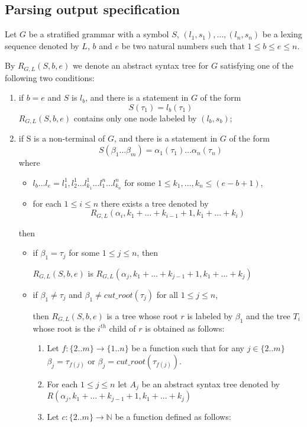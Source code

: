 \documentclass[a4paper,10pt]{article}
\begin{document}
\subsection{Parsing output specification}

Let $G$ be a stratified grammar with a symbol $S$,  $(l_1,s_1),\ldots, (l_n,s_n)$ be a lexing sequence denoted by $L$, $b$ and $e$ be two natural numbers such that $1 \le b \le e \le n$.


 By $R_{G,L}(S,b,e)$ we denote an abstract syntax tree for $G$ satisfying one of the following two conditions: 
\begin{enumerate}
\item if $b = e$ and $S$ is  $l_b$, and there is a statement in $G$ of the form
  $$ S(\tau_1) = l_b(\tau_1) $$
 $R_{G,L}(S,b,e)$ contains only one node labeled by $(l_b, s_b)$; 
 
\item if S is a non-terminal of $G$, and there is a statement in $G$ of the form 
$$ S(\beta_1 \ldots \beta_m) = \alpha_1(\tau_1) \ldots  \alpha_n(\tau_n)  $$
where 
\begin{itemize}
\item $l_b \dots l_e = l^1_1,l^1_2 \ldots l^1_{k_1} \ldots l^n_1 \ldots l^n_{k_n}$ for some  $1 \le k_1,\ldots,k_n \le (e-b+1)$,
\item for each $1\le i \le n$ there exists a tree denoted by $$R_{G,L}(\alpha_i,k_1+ \ldots + k_{i-1}+1, k_1+ \ldots + k_{i})$$
\end{itemize}
then
\begin{itemize}
\item if $\beta_1 = \tau_j$ for some $ 1\le j \le n$, then

  $R_{G,L}(S,b,e)$ is $R_{G,L}(\alpha_j,k_1+ \ldots + k_{j-1}+1, k_1+ \ldots + k_{j})$  

\item if $\beta_1 \not= \tau_j$ and  $\beta_1 \not= cut\_root(\tau_j)$   for all $ 1\le j \le n$, 

  then $R_{G,L}(S,b,e)$ is a tree whose root $r$ is labeled by $\beta_1$ and the tree $T_i$ whose root is the $i^{th}$ child of $r$ is obtained as follows:
 \begin{enumerate}
 \item Let $f:\{2..m\} \to \{1..n\}$ be a function such that for any $j \in \{2..m\}$ $\beta_j = \tau_{f(j)}$ or  $\beta_j = cut\_root(\tau_{f(j)})$.
 \item For each $1\le j \le n$ let $A_j$ be an abstract syntax tree denoted by $R(\alpha_j,k_1+ \ldots + k_{j-1}+1, k_1+ \ldots + k_{j})$
 \item Let $c:\{2..m\} \to \mathbb{N}$ be a function defined as follows:


\end{enumerate}
\end{itemize}
\end{enumerate}
\end{document}
